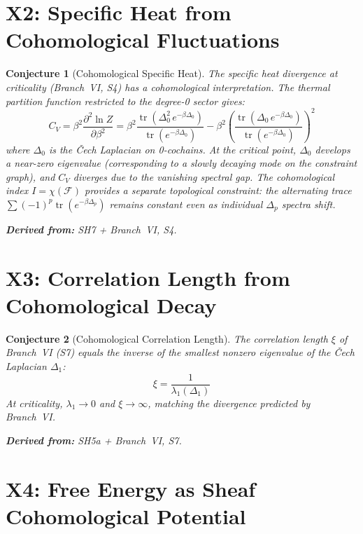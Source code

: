 \documentclass[11pt,letterpaper]{article}
\newtheorem{conjecture}{Conjecture}[section]
\newcommand{\tr}{\operatorname{tr}}
\newcommand{\sheaf}{\mathcal{F}}
\begin{document}
\section{X2: Specific Heat from Cohomological Fluctuations}

\begin{conjecture}[Cohomological Specific 
Heat]\label{conj:x_specific_heat}
The specific heat divergence at criticality (Branch~VI, S4) has a 
cohomological interpretation. The thermal partition function restricted 
to the degree-0 sector gives:
\begin{equation}\label{eq:coh_specific_heat}
    C_V = \beta^2 \frac{\partial^2 \ln Z}{\partial \beta^2} 
    = \beta^2 \frac{\tr\left(\Delta_0^2 
    \, e^{-\beta \Delta_0}\right)}{\tr(e^{-\beta \Delta_0})} 
    - \beta^2 \left(\frac{\tr\left(\Delta_0 
    \, e^{-\beta \Delta_0}\right)}{\tr(e^{-\beta \Delta_0})}\right)^2
\end{equation}
where $\Delta_0$ is the \v{C}ech Laplacian on 0-cochains. At the 
critical point, $\Delta_0$ develops a near-zero eigenvalue 
(corresponding to a slowly decaying mode on the constraint graph), 
and $C_V$ diverges due to the vanishing spectral gap. The 
cohomological index $I = \chi(\sheaf)$ provides a separate 
topological constraint: the alternating trace $\sum (-1)^p 
\tr(e^{-\beta \Delta_p})$ remains constant even as individual 
$\Delta_p$ spectra shift.

\textbf{Derived from:} SH7 + Branch~VI, S4.
\end{conjecture}

\section{X3: Correlation Length from Cohomological Decay}

\begin{conjecture}[Cohomological Correlation 
Length]\label{conj:x_correlation}
The correlation length $\xi$ of Branch~VI (S7) equals the inverse of 
the smallest nonzero eigenvalue of the \v{C}ech Laplacian 
$\Delta_1$:
\begin{equation}\label{eq:coh_correlation}
    \xi = \frac{1}{\lambda_1(\Delta_1)}
\end{equation}
At criticality, $\lambda_1 \to 0$ and $\xi \to \infty$, matching the 
divergence predicted by Branch~VI.

\textbf{Derived from:} SH5a + Branch~VI, S7.
\end{conjecture}

\section{X4: Free Energy as Sheaf Cohomological Potential}
\end{document}
